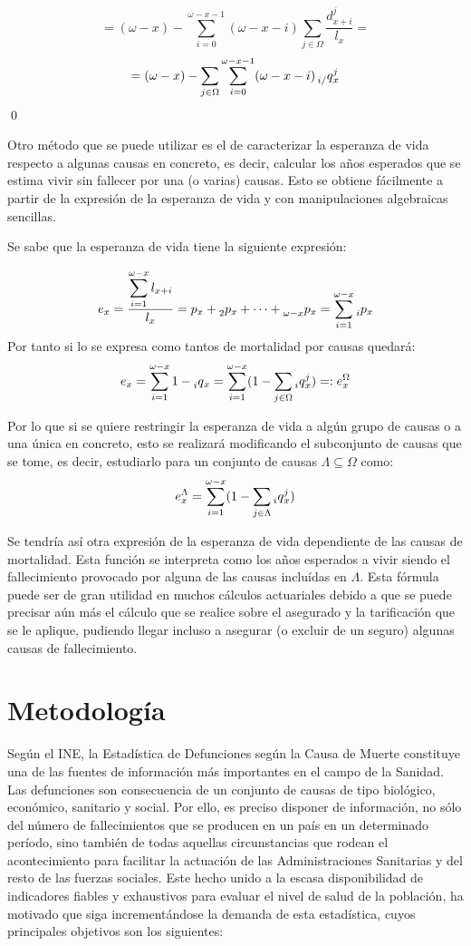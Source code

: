\documentclass{article}
\newcommand{\finaldem}{\hfill {\qed}}
\begin{document}
$$
=(\omega-x)-\sum_{i=0}^{\omega-x-1}(\omega-x-i)\sum_{j\in\Omega}\frac{d_{x+i}^{j}}{l_{x}}=
$$
$$
=(\omega-x)-\sum_{j\in\Omega}\sum_{i=0}^{\omega-x-1}(\omega-x-i)\prescript{}{i/}q_{x}^{j}
$$
\finaldem

Otro método que se puede utilizar es el de caracterizar la esperanza de vida respecto a algunas causas en concreto, es decir, calcular los años esperados que se estima vivir sin fallecer por una (o varias) causas. Esto se obtiene fácilmente a partir de la expresión de la esperanza de vida y con manipulaciones algebraicas sencillas.

Se sabe que la esperanza de vida tiene la siguiente expresión:

$$
e_{x}=\frac{\displaystyle\sum_{i=1}^{\omega-x}l_{x+i}}{l_{x}}=p_{x}+\prescript{}{2}p_{x}+\dots+\prescript{}{\omega-x}p_{x}=\sum_{i=1}^{\omega-x}\prescript{}{i}p_{x}
$$
Por tanto si lo se expresa como tantos de mortalidad por causas quedará:
$$
e_{x}=\sum_{i=1}^{\omega-x}1-\prescript{}{i}q_{x}=\sum_{i=1}^{\omega-x}(1-\sum_{j\in\Omega}\prescript{}{i}q_{x}^{j})=:e_{x}^{\Omega}
$$

Por lo que si se quiere restringir la esperanza de vida a algún grupo de causas o a una única en concreto, esto se realizará modificando el subconjunto de causas que se tome, es decir, estudiarlo para un conjunto de causas $\Lambda\subseteq\Omega$ como:
$$
e_{x}^{\Lambda}=\sum_{i=1}^{\omega-x}(1-\sum_{j\in\Lambda}\prescript{}{i}q_{x}^{j})
$$

Se tendría así otra expresión de la esperanza de vida dependiente de las causas de mortalidad. Esta función se interpreta como los años esperados a vivir siendo el fallecimiento provocado por alguna de las causas incluídas en $\Lambda$. Esta fórmula puede ser de gran utilidad en muchos cálculos actuariales debido a que se puede precisar aún más el cálculo que se realice sobre el asegurado y la tarificación que se le aplique, pudiendo llegar incluso a asegurar (o excluir de un seguro) algunas causas de fallecimiento.
\newpage
\section{Metodología}
Según el INE, la Estadística de Defunciones según la Causa de Muerte constituye una de las fuentes de información más importantes en el campo de la Sanidad.
Las defunciones son consecuencia de un conjunto de causas de tipo biológico, económico, sanitario y social. Por ello, es preciso disponer de información, no sólo del número de fallecimientos que se producen en un país en un determinado período, sino también de todas aquellas circunstancias que rodean el acontecimiento para facilitar la actuación de las Administraciones Sanitarias y del resto de las fuerzas sociales.
Este hecho unido a la escasa disponibilidad de indicadores fiables y exhaustivos para evaluar el nivel de salud de la población, ha motivado que siga incrementándose la demanda de esta estadística, cuyos principales objetivos son los siguientes: 
\end{document}
